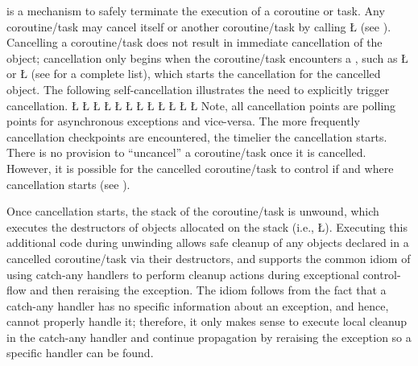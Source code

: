 \documentclass[openright,twoside]{report}
\newcommand{\BF}[1]{\Textbf{#1}}
\begin{document}
 is a mechanism to safely terminate the execution of a coroutine or task.
Any coroutine/task may cancel itself or another coroutine/task by calling \LGinlinetrue\LGbegin\lgrinde\L{}\endlgrinde\LGend{} (see ).
Cancelling a coroutine/task does not result in immediate cancellation of the object;
cancellation only begins when the coroutine/task encounters a , such as \LGinlinetrue\LGbegin\lgrinde\L{}\endlgrinde\LGend{} or \LGinlinetrue\LGbegin\lgrinde\L{}\endlgrinde\LGend{} (see  for a complete list), which starts the cancellation for the cancelled object.
The following self-cancellation illustrates the need to explicitly trigger cancellation.
\LGinlinefalse\LGbegin\lgrinde
\L{}
\L{\LB{}}
\L{\LB{}\Tab{8}{\BF{\V{cancel}();}}}
\CE{}\L{\LB{}\Tab{8}{\BF{\V{uEHM}::\V{poll}();}}}
\CE{}\L{\LB{}}
\CE{}\L{\LB{}}
\L{}
\L{\LB{}}
\L{\LB{}}
\L{\LB{}}
\CE{}\L{\LB{}}
\L{\LB{\};}}
\endlgrinde\LGend
Note, all cancellation points are polling points for asynchronous exceptions and vice-versa.
The more frequently cancellation checkpoints are encountered, the timelier the cancellation starts.
There is no provision to ``uncancel'' a coroutine/task once it is cancelled.
However, it is possible for the cancelled coroutine/task to control if and where cancellation starts (see ).

Once cancellation starts, the stack of the coroutine/task is unwound, which executes the destructors of objects allocated on the stack  (i.e., \LGinlinetrue\LGbegin\lgrinde\L{}\endlgrinde\LGend{}).
Executing this additional code during unwinding allows safe cleanup of any objects declared in a cancelled coroutine/task via their destructors, and supports the common \CC idiom of using catch-any handlers to perform cleanup actions during exceptional control-flow and then reraising the exception.
The \CC idiom follows from the fact that a catch-any handler has no specific information about an exception, and hence, cannot properly handle it;
therefore, it only makes sense to execute local cleanup in the catch-any handler and continue propagation by reraising the exception so a specific handler can be found.
\end{document}
